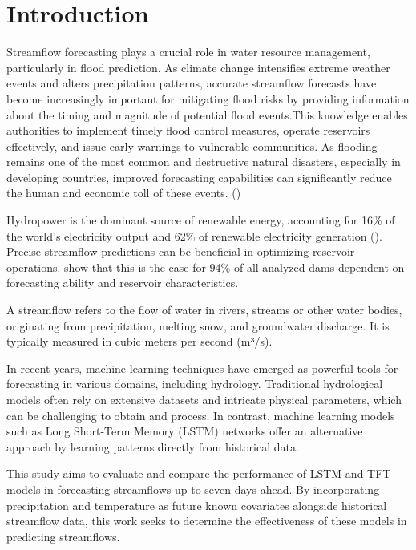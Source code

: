 \documentclass[
]{krantz}
\begin{document}
\section{Introduction}\label{introduction-4}

Streamflow forecasting plays a crucial role in water resource management, particularly in flood prediction. As climate change intensifies extreme weather events and alters precipitation patterns, accurate streamflow forecasts have become increasingly important for mitigating flood risks by providing information about the timing and magnitude of potential flood events.This knowledge enables authorities to implement timely flood control measures, operate reservoirs effectively, and issue early warnings to vulnerable communities. As flooding remains one of the most common and destructive natural disasters, especially in developing countries, improved forecasting capabilities can significantly reduce the human and economic toll of these events. (\citet{nearing2024})

Hydropower is the dominant source of renewable energy, accounting for 16\% of the world's electricity output and 62\% of renewable electricity generation (\citet{lee2022}). Precise streamflow predictions can be beneficial in optimizing reservoir operations. \citet{lee2022} show that this is the case for 94\% of all analyzed dams dependent on forecasting ability and reservoir characteristics.

A streamflow refers to the flow of water in rivers, streams or other water bodies, originating from precipitation, melting snow, and groundwater discharge. It is typically measured in cubic meters per second (m³/s).

In recent years, machine learning techniques have emerged as powerful tools for forecasting in various domains, including hydrology. Traditional hydrological models often rely on extensive datasets and intricate physical parameters, which can be challenging to obtain and process. In contrast, machine learning models such as Long Short-Term Memory (LSTM) networks offer an alternative approach by learning patterns directly from historical data.

This study aims to evaluate and compare the performance of LSTM and TFT models in forecasting streamflows up to seven days ahead. By incorporating precipitation and temperature as future known covariates alongside historical streamflow data, this work seeks to determine the effectiveness of these models in predicting streamflows.
\end{document}
